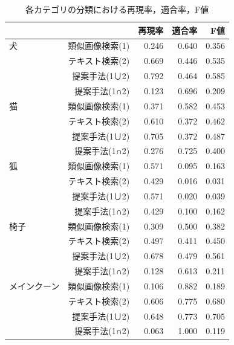 \begin{table}%
\begin{center}
\caption{各カテゴリの分類における再現率，適合率，F値}
\label{tab:result-ex}
\begin{tabular}{|l|r|r|r|r|}\hline
&& 再現率& 適合率& F値\\ \hline \hline
犬
& 類似画像検索(1)& 0.246& 0.640& 0.356 \\ \cline{2-5}
& テキスト検索(2)& 0.669& 0.446& 0.535 \\ \cline{2-5}
& 提案手法(1∪2)& 0.792& 0.464& 0.585 \\ \cline{2-5}
& 提案手法(1∩2)& 0.123& 0.696& 0.209 \\ \hline
猫
& 類似画像検索(1)& 0.371& 0.582& 0.453 \\ \cline{2-5}
& テキスト検索(2)& 0.610& 0.372& 0.462 \\ \cline{2-5}
& 提案手法(1∪2)& 0.705& 0.372& 0.487 \\ \cline{2-5}
& 提案手法(1∩2)& 0.276& 0.725& 0.400 \\ \hline
狐
& 類似画像検索(1)& 0.571& 0.095& 0.163 \\ \cline{2-5}
& テキスト検索(2)& 0.429& 0.016& 0.031 \\ \cline{2-5}
& 提案手法(1∪2)& 0.571& 0.020& 0.039 \\ \cline{2-5}
& 提案手法(1∩2)& 0.429& 0.100& 0.162 \\ \hline
椅子
& 類似画像検索(1)& 0.309& 0.500& 0.382 \\ \cline{2-5}
& テキスト検索(2)& 0.497& 0.411& 0.450 \\ \cline{2-5}
& 提案手法(1∪2)& 0.678& 0.479& 0.561 \\ \cline{2-5}
& 提案手法(1∩2)& 0.128& 0.613& 0.211 \\ \hline
メインクーン
& 類似画像検索(1)& 0.106& 0.882& 0.189 \\ \cline{2-5}
& テキスト検索(2)& 0.606& 0.775& 0.680 \\ \cline{2-5}
& 提案手法(1∪2)& 0.648& 0.773& 0.705 \\ \cline{2-5}
& 提案手法(1∩2)& 0.063& 1.000& 0.119 \\ \hline
\end{tabular}
\end{center}
\end{table}


